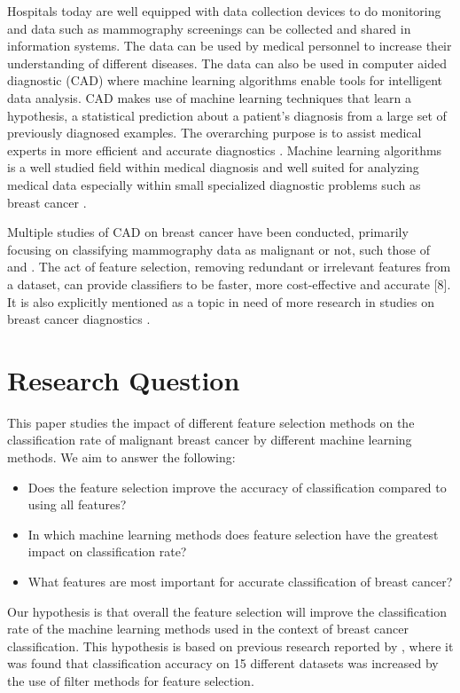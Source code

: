 \documentclass{kththesis}
\begin{document}
Hospitals today are well equipped with data collection devices to do monitoring and data such as mammography screenings can be collected and shared in information systems. The data can be used by medical personnel to increase their understanding of different diseases. The data can also be used in computer aided diagnostic (CAD) where machine learning algorithms enable tools for intelligent data analysis. CAD makes use of machine learning techniques that learn a hypothesis, a statistical prediction about a patient's diagnosis from a large set of previously diagnosed examples.  The overarching purpose is to assist medical experts in more efficient and accurate diagnostics \parencite{li2007}. Machine learning algorithms is a well studied field within medical diagnosis and well suited for analyzing medical data especially within small specialized diagnostic problems such as breast cancer \parencite{kononenko2001}.

Multiple studies of CAD on breast cancer have been conducted, primarily focusing on classifying mammography data as malignant or not, such those of \textcite{ramos2012} and \textcite{akay2009}. The act of feature selection, removing redundant or irrelevant features from a dataset, can provide classifiers to be faster, more cost-effective and accurate [8]. It is also explicitly mentioned as a topic in need of more research in studies on breast cancer diagnostics \parencite{akin2011}.

\section{Research Question}

This paper studies the impact of different feature selection methods on the classification rate of malignant breast cancer by different machine learning methods. We aim to answer the following:

\begin{itemize}
  \item Does the feature selection improve the accuracy of classification compared to using all features?
  \item In which machine learning methods does feature selection have the greatest impact on classification rate?
  \item What features are most important for accurate classification of breast cancer?
\end{itemize}

Our hypothesis is that overall the feature selection will improve the classification rate of the machine learning methods used in the context of breast cancer classification. This hypothesis is based on previous research reported by \textcite{karabulut2012}, where it was found that classification accuracy on 15 different datasets was increased by the use of filter methods for feature selection.
\end{document}
